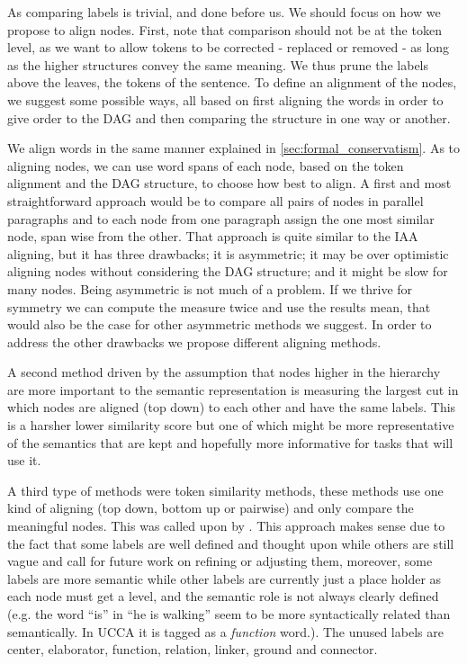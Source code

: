 \documentclass[letter,11pt]{article}
\begin{document}
As comparing labels is trivial, and done before us. We should focus on how we propose to align nodes. 
First, note that comparison should not be at
the token level, as we want to allow tokens to be corrected - replaced or removed -
as long as the higher structures convey the same meaning. We thus
prune the labels above the leaves, the tokens of the sentence. To
define an alignment of the nodes, we suggest some possible ways, all
based on first aligning the words in order to give order to the DAG and then comparing the structure in one way or another.

We align words in the same manner explained in \ref{sec:formal_conservatism}.
As to aligning nodes, we can use word spans of each node, based on
the token alignment and the DAG structure, to choose how best to align.
A first and most straightforward approach would be to compare all
pairs of nodes in parallel paragraphs and to each node from one paragraph
assign the one most similar node, span wise from the other. That approach
is quite similar to the IAA aligning, but it
has three drawbacks; it is asymmetric; it may be over optimistic aligning
nodes without considering the DAG structure; and it might be
slow for many nodes. Being asymmetric is not much of a problem. If we thrive for symmetry
we can compute the measure twice and use the results mean,
that would also be the case for other asymmetric methods we suggest.
In order to address the other drawbacks we propose different aligning methods.

A second method driven by the assumption that nodes higher in the
hierarchy are more important to the semantic representation is measuring
the largest cut in which nodes are aligned (top down) to each other
and have the same labels. This is a harsher lower similarity
score but one of which might be more representative of the semantics
that are kept and hopefully more informative for tasks that will use it.

A third type of methods were token similarity methods, these methods
use one kind of aligning (top down, bottom up or pairwise) and only
compare the meaningful nodes. This was called upon by \cite{sulem2015conceptual}. 
This approach makes sense due to the fact that some labels
are well defined and thought upon while others are still vague and
call for future work on refining or adjusting them, moreover, some
labels are more semantic while other labels are currently just a place
holder as each node must get a level, and the semantic role is not
always clearly defined (e.g. the word ``is'' in ``he is walking''
seem to be more syntactically related than semantically. In UCCA it is tagged as a \textit{function} word.). The unused
labels are center, elaborator, function, relation, linker, ground
and connector.
\end{document}
